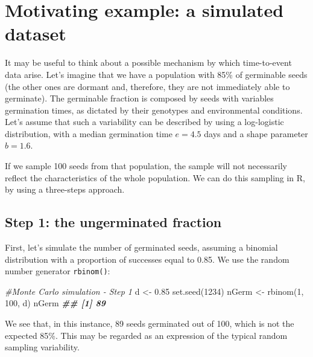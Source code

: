 \documentclass[
]{book}
\newenvironment{Shaded}{\begin{snugshade}}{\end{snugshade}}
\newcommand{\CommentTok}[1]{\textcolor[rgb]{0.56,0.35,0.01}{\textit{#1}}}
\newcommand{\DecValTok}[1]{\textcolor[rgb]{0.00,0.00,0.81}{#1}}
\newcommand{\DocumentationTok}[1]{\textcolor[rgb]{0.56,0.35,0.01}{\textbf{\textit{#1}}}}
\newcommand{\FloatTok}[1]{\textcolor[rgb]{0.00,0.00,0.81}{#1}}
\newcommand{\FunctionTok}[1]{\textcolor[rgb]{0.00,0.00,0.00}{#1}}
\newcommand{\NormalTok}[1]{#1}
\newcommand{\OtherTok}[1]{\textcolor[rgb]{0.56,0.35,0.01}{#1}}
\begin{document}
\hypertarget{motivating-example-a-simulated-dataset}{%
\section{Motivating example: a simulated dataset}\label{motivating-example-a-simulated-dataset}}

It may be useful to think about a possible mechanism by which time-to-event data arise. Let's imagine that we have a population with 85\% of germinable seeds (the other ones are dormant and, therefore, they are not immediately able to germinate). The germinable fraction is composed by seeds with variables germination times, as dictated by their genotypes and environmental conditions. Let's assume that such a variability can be described by using a log-logistic distribution, with a median germination time \(e = 4.5\) days and a shape parameter \(b = 1.6\).

If we sample 100 seeds from that population, the sample will not necessarily reflect the characteristics of the whole population. We can do this sampling in R, by using a three-steps approach.

\hypertarget{step-1-the-ungerminated-fraction}{%
\subsection{Step 1: the ungerminated fraction}\label{step-1-the-ungerminated-fraction}}

First, let's simulate the number of germinated seeds, assuming a binomial distribution with a proportion of successes equal to 0.85. We use the random number generator \texttt{rbinom()}:

\begin{Shaded}
\begin{Highlighting}[]
\CommentTok{\#Monte Carlo simulation {-} Step 1}
\NormalTok{d }\OtherTok{\textless{}{-}} \FloatTok{0.85}
\FunctionTok{set.seed}\NormalTok{(}\DecValTok{1234}\NormalTok{)}
\NormalTok{nGerm }\OtherTok{\textless{}{-}} \FunctionTok{rbinom}\NormalTok{(}\DecValTok{1}\NormalTok{, }\DecValTok{100}\NormalTok{, d)}
\NormalTok{nGerm}
\DocumentationTok{\#\# [1] 89}
\end{Highlighting}
\end{Shaded}

We see that, in this instance, 89 seeds germinated out of 100, which is not the expected 85\%. This may be regarded as an expression of the typical random sampling variability.
\end{document}
